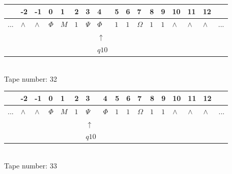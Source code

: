 \documentclass[11pt]{article}
\begin{document}
\begin{table}[H]
\centering
\begin{tabular}{lllllllllllllllll}
 & -2 & -1 & 0 & 1 & 2 & 3 & 4 & 5 & 6 & 7 & 8 & 9 & 10 & 11 & 12 & \\
\hline
$...$ & \multicolumn{1}{|l|}{$\wedge$} & \multicolumn{1}{|l|}{$\wedge$} & \multicolumn{1}{|l|}{$\Phi$} & \multicolumn{1}{|l|}{$M$} & \multicolumn{1}{|l|}{$1$} & \multicolumn{1}{|l|}{$\Psi$} & \multicolumn{1}{|l|}{$\Phi$} & \multicolumn{1}{|l|}{$1$} & \multicolumn{1}{|l|}{$1$} & \multicolumn{1}{|l|}{$\Omega$} & \multicolumn{1}{|l|}{$1$} & \multicolumn{1}{|l|}{$1$} & \multicolumn{1}{|l|}{$\wedge$} & \multicolumn{1}{|l|}{$\wedge$} & \multicolumn{1}{|l|}{$\wedge$} & $...$\\
\hline
&  &  &  &  &  &  & $\uparrow$ &  &  &  &  &  &  &  &  &  \\
&  &  &  &  &  &  & $ q10 $ &  &  &  &  &  &  &  &  &  \\
\end{tabular}
\\
Tape number: 32
\noindent\makebox[\linewidth]{\hdashrule{\textwidth}{1pt}{1pt}}\end{table}

\begin{table}[H]
\centering
\begin{tabular}{lllllllllllllllll}
 & -2 & -1 & 0 & 1 & 2 & 3 & 4 & 5 & 6 & 7 & 8 & 9 & 10 & 11 & 12 & \\
\hline
$...$ & \multicolumn{1}{|l|}{$\wedge$} & \multicolumn{1}{|l|}{$\wedge$} & \multicolumn{1}{|l|}{$\Phi$} & \multicolumn{1}{|l|}{$M$} & \multicolumn{1}{|l|}{$1$} & \multicolumn{1}{|l|}{$\Psi$} & \multicolumn{1}{|l|}{$\Phi$} & \multicolumn{1}{|l|}{$1$} & \multicolumn{1}{|l|}{$1$} & \multicolumn{1}{|l|}{$\Omega$} & \multicolumn{1}{|l|}{$1$} & \multicolumn{1}{|l|}{$1$} & \multicolumn{1}{|l|}{$\wedge$} & \multicolumn{1}{|l|}{$\wedge$} & \multicolumn{1}{|l|}{$\wedge$} & $...$\\
\hline
&  &  &  &  &  & $\uparrow$ &  &  &  &  &  &  &  &  &  &  \\
&  &  &  &  &  & $ q10 $ &  &  &  &  &  &  &  &  &  &  \\
\end{tabular}
\\
Tape number: 33
\noindent\makebox[\linewidth]{\hdashrule{\textwidth}{1pt}{1pt}}\end{table}
\end{document}
